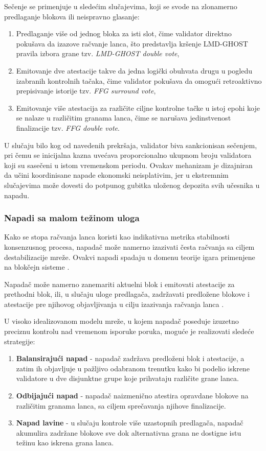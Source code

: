 Sečenje se primenjuje u sledećim slučajevima, koji se svode na zlonamerno predlaganje blokova ili neispravno glasanje:
\begin{enumerate}
\item Predlaganje više od jednog bloka za isti slot, čime validator direktno pokušava da izazove račvanje lanca, što predstavlja kršenje LMD-GHOST pravila izbora grane tzv. \textit{LMD-GHOST double vote},
\item Emitovanje dve atestacije takve da jedna logički obuhvata drugu u pogledu izabranih kontrolnih tačaka, čime validator pokušava da omogući retroaktivno prepisivanje istorije tzv. \textit{FFG surround vote},
\item Emitovanje više atestacija za različite ciljne kontrolne tačke u istoj epohi koje se nalaze u različitim granama lanca, čime se narušava jedinstvenost finalizacije tzv. \textit{FFG double vote}.
\end{enumerate}

U slučaju bilo kog od navedenih prekršaja, validator biva sankcionisan sečenjem, pri čemu se inicijalna kazna uvećava proporcionalno ukupnom broju validatora koji su sasečeni u istom vremenskom periodu. Ovakav mehanizam je dizajniran da učini koordinisane napade ekonomski neisplativim, jer u ekstremnim slučajevima može dovesti do potpunog gubitka uloženog depozita svih učesnika u napadu.

\subsubsection{Napadi sa malom težinom uloga}
Kako se stopa račvanja lanca koristi kao indikativna metrika stabilnosti konsenzusnog procesa, napadač može namerno izazivati česta račvanja sa ciljem destabilizacije mreže. Ovakvi napadi spadaju u domenu teorije igara primenjene na blokčejn sisteme \cite{pavloff2024game}.

Napadač može namerno zanemariti aktuelni blok i emitovati atestacije za prethodni blok, ili, u slučaju uloge predlagača, zadržavati predložene blokove i atestacije pre njihovog objavljivanja u cilju izazivanja račvanja lanca \cite{neuder2021low}.

U visoko idealizovanom modelu mreže, u kojem napadač poseduje izuzetno preciznu kontrolu nad vremenom isporuke poruka, moguće je realizovati sledeće strategije:
\begin{enumerate}
\item \textbf{Balansirajući napad}  - napadač zadržava predloženi blok i atestacije, a zatim ih objavljuje u pažljivo odabranom trenutku kako bi podelio iskrene validatore u dve disjunktne grupe koje prihvataju različite grane lanca.
\item \textbf{Odbijajući napad}  - napadač naizmenično atestira opravdane blokove na različitim granama lanca, sa ciljem sprečavanja njihove finalizacije.
\item \textbf{Napad lavine}  - u slučaju kontrole više uzastopnih predlagača, napadač akumulira zadržane blokove sve dok alternativna grana ne dostigne istu težinu kao iskrena grana lanca.
\end{enumerate}

